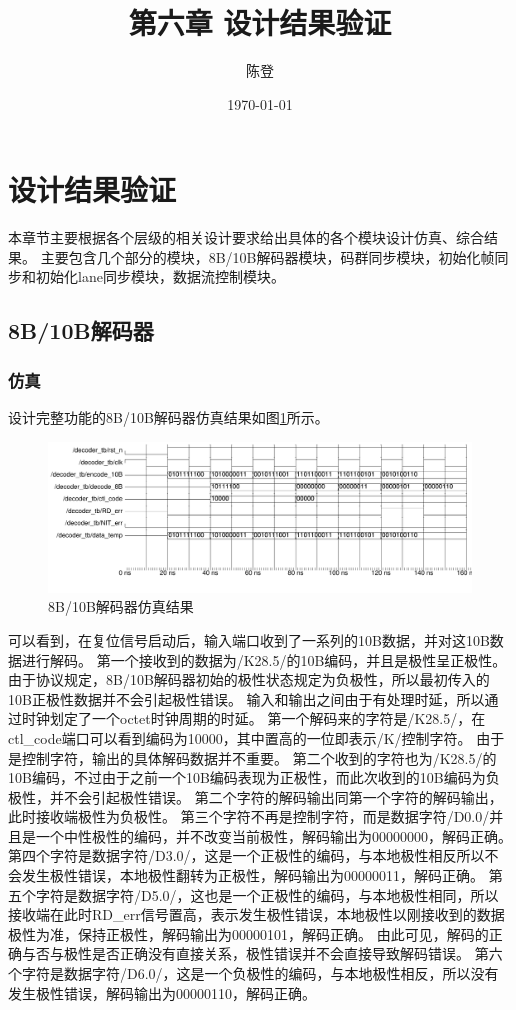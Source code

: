 \documentclass[UTF8]{ctexart}
\title{第六章 设计结果验证}
\author{陈登}
\date{\today}
\begin{document}
\section{设计结果验证}

本章节主要根据各个层级的相关设计要求给出具体的各个模块设计仿真、综合结果。
主要包含几个部分的模块，8B/10B解码器模块，码群同步模块，初始化帧同步和初始化lane同步模块，数据流控制模块。

\subsection{8B/10B解码器}

\subsubsection{仿真}

设计完整功能的8B/10B解码器仿真结果如图\ref{fig:8b_10b_decoder_wave}所示。

\begin{figure}[H]
	\centering
	\includegraphics[width=18cm]{./img/8b_10b_decoder_wave.pdf}
	\caption{8B/10B解码器仿真结果}
	\label{fig:8b_10b_decoder_wave}
\end{figure}

可以看到，在复位信号启动后，输入端口收到了一系列的10B数据，并对这10B数据进行解码。
第一个接收到的数据为/K28.5/的10B编码，并且是极性呈正极性。
由于协议规定，8B/10B解码器初始的极性状态规定为负极性，所以最初传入的10B正极性数据并不会引起极性错误。
输入和输出之间由于有处理时延，所以通过时钟划定了一个octet时钟周期的时延。
第一个解码来的字符是/K28.5/，在ctl\_code端口可以看到编码为10000，其中置高的一位即表示/K/控制字符。
由于是控制字符，输出的具体解码数据并不重要。
第二个收到的字符也为/K28.5/的10B编码，不过由于之前一个10B编码表现为正极性，而此次收到的10B编码为负极性，并不会引起极性错误。
第二个字符的解码输出同第一个字符的解码输出，此时接收端极性为负极性。
第三个字符不再是控制字符，而是数据字符/D0.0/并且是一个中性极性的编码，并不改变当前极性，解码输出为00000000，解码正确。
第四个字符是数据字符/D3.0/，这是一个正极性的编码，与本地极性相反所以不会发生极性错误，本地极性翻转为正极性，解码输出为00000011，解码正确。
第五个字符是数据字符/D5.0/，这也是一个正极性的编码，与本地极性相同，所以接收端在此时RD\_err信号置高，表示发生极性错误，本地极性以刚接收到的数据极性为准，保持正极性，解码输出为00000101，解码正确。
由此可见，解码的正确与否与极性是否正确没有直接关系，极性错误并不会直接导致解码错误。
第六个字符是数据字符/D6.0/，这是一个负极性的编码，与本地极性相反，所以没有发生极性错误，解码输出为00000110，解码正确。
\end{document}
